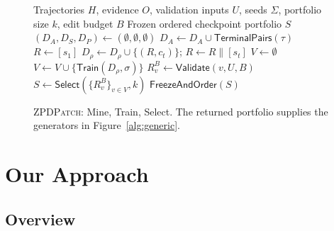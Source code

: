 \documentclass[10pt,conference]{IEEEtran}
\begin{document}
\begin{figure}[h]
\small
\begin{algorithmic}[1]
\Require Trajectories $H$, evidence $O$, validation inputs $U$, seeds $\Sigma$, portfolio size $k$, edit budget $B$
\Ensure Frozen ordered checkpoint portfolio $S$
\State $(D_A,D_S,D_P)\gets(\emptyset,\emptyset,\emptyset)$ 
 \State $D_A\gets D_A\cup\mathsf{TerminalPairs}(\tau)$
  \State $R\gets[s_1]$
    \State $D_\rho\gets D_\rho\cup\{(R,c_t)\}$; $R\gets R\mathbin{\|}[s_t]$
   \EndIf
  \EndFor
 \EndFor
\EndFor
\State $V\gets\emptyset$ 
 \State $V\gets V\cup\{\mathsf{Train}(D_\rho,\sigma)\}$
\EndFor
{} 
 \State $R_v^B\gets\mathsf{Validate}(v,U,B)$
\EndFor
\State $S\gets\mathsf{Select}(\{R_v^B\}_{v\in V},k)$
\State \Return $\mathsf{FreezeAndOrder}(S)$
\end{algorithmic}
\caption{\textsc{ZPDPatch}: Mine, Train, Select. The returned portfolio supplies the generators in Figure~\ref{alg:generic}.}
\label{alg:tool}
\end{figure}

\section{Our Approach}
\label{sec:approach}
\subsection{Overview}
\end{document}
